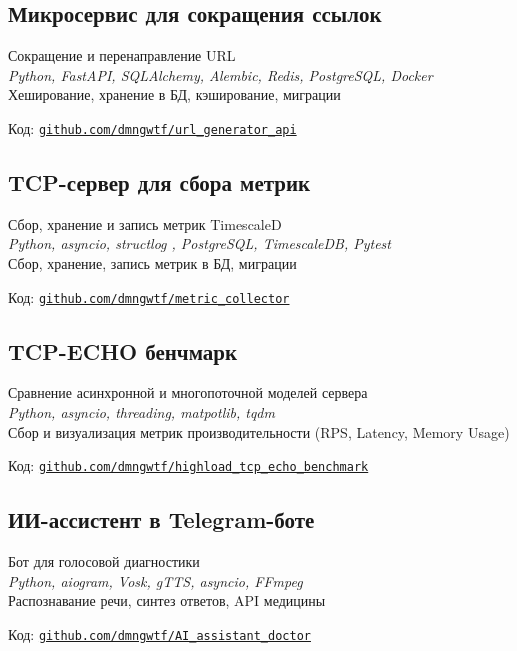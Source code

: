 \documentclass[a4paper,12pt]{article}
\begin{document}
	\subsection*{Микросервис для сокращения ссылок}
	Сокращение и перенаправление URL  \\
	\textit{Python, FastAPI, SQLAlchemy, Alembic, Redis, PostgreSQL, Docker} \\ 
	Хеширование, хранение в БД, кэширование, миграции\\
	{Код: \href{https://github.com/dmngwtf/url_generator_api}{\texttt{github.com/dmngwtf/url\_generator\_api}}
	
	
	\subsection*{TCP-сервер для сбора метрик}
	Сбор, хранение и запись метрик  TimescaleD \\
	\textit{Python, asyncio, structlog , PostgreSQL, TimescaleDB, Pytest} \\ 
	Сбор, хранение, запись метрик в БД, миграции\\
	{Код: \href{https://github.com/dmngwtf/metric_collector}{\texttt{github.com/dmngwtf/metric\_collector}}
		
	\subsection*{TCP-ECHO бенчмарк}
	Сравнение асинхронной и многопоточной моделей сервера\\
	\textit{Python, asyncio, threading, matpotlib, tqdm} \\ 
	Сбор и визуализация метрик производительности (RPS, Latency, Memory Usage)\\
	{Код: \href{https://github.com/dmngwtf/highload_tcp_echo_server_benchmark}{\texttt{github.com/dmngwtf/highload\_tcp\_echo\_benchmark}}
		
	
	
	\subsection*{ИИ-ассистент в Telegram-боте}
	Бот для голосовой диагностики  \\
	\textit{Python, aiogram, Vosk, gTTS, asyncio, FFmpeg} \\ 
	Распознавание речи, синтез ответов, API медицины\\
	{Код: \href{https://github.com/dmngwtf/AI_assistant_doctor}{\texttt{github.com/dmngwtf/AI\_assistant\_doctor}}
	
}}}}
\end{document}
